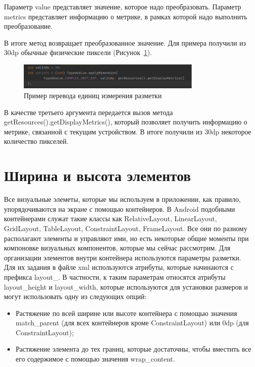 Параметр value представляет значение, которое надо преобразовать.
Параметр metrics представляет информацию о метрике, в рамках которой
надо выполнить преобразование.\par
В итоге метод возвращает преобразованное значение. 
Для примера получили из 30dp обычные физические пиксели
(Рисунок~\ref{fig:java:applydim}).

\begin{figure}[h!tp]
	\centering
	\includegraphics[width=0.8\textwidth]{Screenshot from 2023-03-10 12-28-01.png}
	\caption{Пример перевода единиц измерения разметки}
	\label{fig:java:applydim}
\end{figure}

В качестве третьего аргумента передается вызов метода
getResources().getDisplayMetrics(), который позволяет получить информацию
о метрике, связанной с текущим устройством. В итоге получили из 30dp
некоторое количество пикселей.

\section{Ширина и высота элементов}
Все визуальные элеметы, которые мы используем в приложении, как
правило, упорядочиваются на экране с помощью контейнеров. В Android
подобными контейнерами служат такие классы как RelativeLayout,
LinearLayout, GridLayout, TableLayout, ConstraintLayout, FrameLayout. Все
они по разному располагают элементы и управляют ими, но есть некоторые
общие моменты при компоновке визуальных компонентов, которые мы
сейчас рассмотрим.
Для организации элементов внутри контейнера используются параметры
разметки. Для их задания в файле xml используются атрибуты, которые
начинаются с префикса layout\_. В частности, к таким параметрам относятся
атрибуты layout\_height и layout\_width, которые используются для установки
размеров и могут использовать одну из следующих опций:
\begin{itemize}
	\item Растяжение по всей ширине или высоте контейнера с помощью значения
		match\_parent (для всех контейнеров кроме ConstraintLayout)
		или 0dp (для ConstraintLayout);
	\item Растяжение элемента до тех границ, которые достаточны,
		чтобы вместить все его содержимое с помощью значения wrap\_content.
\end{itemize}

